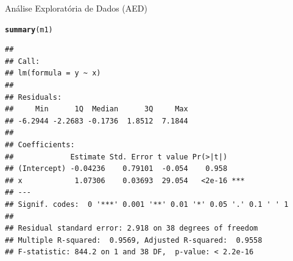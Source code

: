 \documentclass{beamer}\usepackage[]{graphicx}\usepackage[]{color}
\makeatletter
\newcommand{\hlstd}[1]{\textcolor[rgb]{0.345,0.345,0.345}{#1}}%
\newcommand{\hlkwd}[1]{\textcolor[rgb]{0.737,0.353,0.396}{\textbf{#1}}}%
\newenvironment{kframe}{%
 \def\at@end@of@kframe{}%
 \ifinner\ifhmode%
  \def\at@end@of@kframe{\end{minipage}}%
  \begin{minipage}{\columnwidth}%
 \fi\fi%
 \def\FrameCommand##1{\hskip\@totalleftmargin \hskip-\fboxsep
 \colorbox{shadecolor}{##1}\hskip-\fboxsep
     \hskip-\linewidth \hskip-\@totalleftmargin \hskip\columnwidth}%
 \MakeFramed {\advance\hsize-\width
   \@totalleftmargin\z@ \linewidth\hsize
   \@setminipage}}%
 {\par\unskip\endMakeFramed%
 \at@end@of@kframe}
\newenvironment{knitrout}{}{} %
\renewenvironment{knitrout}{\setlength{\topsep}{0mm}}{}
\makeatother
\begin{document}
\begin{frame}[fragile]{Análise Exploratória de Dados (AED)}

\begin{knitrout}\tiny
{}\color{fgcolor}\begin{kframe}
\begin{alltt}
\hlkwd{summary}\hlstd{(m1)}
\end{alltt}
\begin{verbatim}
## 
## Call:
## lm(formula = y ~ x)
## 
## Residuals:
##     Min      1Q  Median      3Q     Max 
## -6.2944 -2.2683 -0.1736  1.8512  7.1844 
## 
## Coefficients:
##             Estimate Std. Error t value Pr(>|t|)    
## (Intercept) -0.04236    0.79101  -0.054    0.958    
## x            1.07306    0.03693  29.054   <2e-16 ***
## ---
## Signif. codes:  0 '***' 0.001 '**' 0.01 '*' 0.05 '.' 0.1 ' ' 1
## 
## Residual standard error: 2.918 on 38 degrees of freedom
## Multiple R-squared:  0.9569,	Adjusted R-squared:  0.9558 
## F-statistic: 844.2 on 1 and 38 DF,  p-value: < 2.2e-16
\end{verbatim}
\end{kframe}
\end{knitrout}


\end{frame} 
% 
\end{document}
